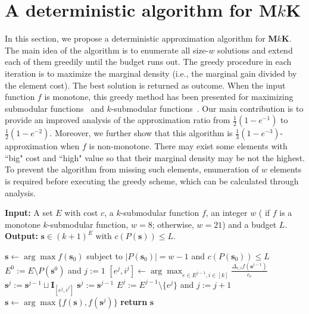 \documentclass[preprint,12pt]{elsarticle}
\def\bs{\boldsymbol{s}}
\def\bI{\boldsymbol{I}}
\def\tM{\textbf{M$k$K}}
\begin{document}
\section{A deterministic algorithm for \tM}\label{alg-ana}
In this section, we propose a deterministic approximation algorithm for \tM. The main idea of the algorithm is to enumerate all size-$w$ solutions and extend each of them greedily until the budget runs out. The greedy procedure in each iteration is to maximize the marginal density (i.e., the marginal gain divided by the element cost). The best solution is returned as outcome.
When the input function $f$ is monotone, this greedy method has been presented for maximizing submodular functions~\cite{M} and $k$-submodular functions~\cite{TWC}. Our main contribution is to provide an improved analysis of the approximation ratio from $\frac{1}{2}(1-e^{-1})$ to $\frac{1}{2}(1-e^{-2})$.
Moreover, we further show that this algorithm is $\frac13(1-e^{-3})$-approximation when $f$ is non-monotone.
There may exist some elements with ``big" cost and ``high" value so that their marginal density may be not the highest.
To prevent the algorithm from missing such elements, enumeration of $w$ elements is required before executing the greedy scheme, which can be calculated through analysis.
\begin{algorithm}[htb]
    \caption{Greedy algorithm for \tM }\label{greedy}
    \textbf{Input:} A set $E$ with cost $c$, a $k$-submodular function $f$, an integer $w$ ( if $f$ is a monotone $k$-submodular function, $w=8$; otherwise, $w=21$) and a budget $L$.\\
    \textbf{Output:} $\bs\in (k+1)^E$ with $c(P(\bs))\le L$.

    \begin{algorithmic}[1]
        \STATE $\bs\gets\arg\max f(\bs_0)$ subject to $|P(\bs_0)|=w-1$ and $c(P(\bs_0))\le L$
        \FOR{every $\bs^0 \ (|P(\bs^0)|=w$ and $c(P(\bs^0))\le L)$}
            \STATE $E^0:=E\setminus P(\bs^0)$ and $j:=1$
                \STATE $[e^j, i^j]\gets \arg\max_{e\in E^{j-1}, i\in[k]}\frac{\Delta_{e, i}f(\bs^{j-1})}{c_e}$
                \IF{$c(P(\bs^{j-1}))+c_{e^j}\le L$}
                    \STATE $\bs^j:=\bs^{j-1}\sqcup\bI_{[e^j, i^j]}$
                \ELSE
                    \STATE $\bs^j:=\bs^{j-1}$
                \ENDIF
                \STATE $E^j:=E^{j-1}\setminus\{e^j\}$ and $j:=j+1$
            \ENDWHILE
            \STATE $\bs\gets \arg\max\{f(\bs), f(\bs^j)\}$
        \ENDFOR
        \STATE \textbf{return } $\bs$
    \end{algorithmic}
\end{algorithm}
\end{document}
